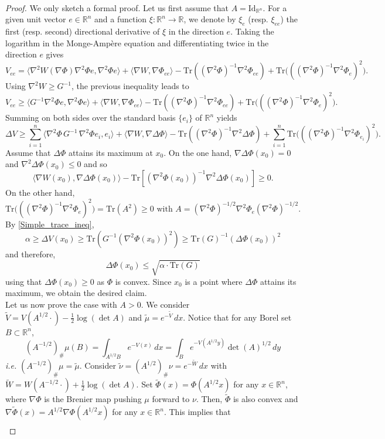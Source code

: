 \documentclass[11pt,a4paper,reqno]{amsart}
\numberwithin{equation}{section}
\theoremstyle{definition}
\renewcommand{\tilde}{\widetilde}
\newcommand{\<}{\ensuremath \leq}
\renewcommand{\>}{\ensuremath \geq}
\renewcommand{\tilde}{\widetilde}
\begin{document}
\hfill \\ \begin{proof} We only sketch a formal proof.
Let us first assume that $A=\mathrm{Id}_{\mathbb{R}^n}.$ 
For a given unit vector $e \in \mathbb{R}^n$ and a function $\xi: \mathbb{R}^n \rightarrow \mathbb{R}$, we denote by $\xi_e$ (resp. $\xi_{ee}$) the first (resp. second) directional derivative of $\xi$ in the direction $e.$ Taking the logarithm in the Monge-Ampère equation and differentiating twice in the direction $e$ gives $$V_{ee}=\langle \nabla^2 W(\nabla \Phi)\nabla^2 \Phi e, \nabla^2 \Phi e \rangle+\langle \nabla W, \nabla \Phi_{ee}\rangle-\mathrm{Tr}((\nabla^2 \Phi)^{-1}\nabla^2 \Phi_{ee})+\mathrm{Tr}\bigl(( (\nabla^2 \Phi)^{-1}\nabla^2 \Phi_e)^2\bigl).$$ Using $\nabla^2 W \geq G^{-1}$, the previous inequality leads to $$V_{ee} \geq \langle G^{-1}\nabla^2 \Phi e, \nabla^2 \Phi e\rangle+\langle \nabla W, \nabla \Phi_{ee}\rangle-\mathrm{Tr}((\nabla^2 \Phi)^{-1}\nabla^2 \Phi_{ee})+\mathrm{Tr}\bigl(( (\nabla^2 \Phi)^{-1}\nabla^2 \Phi_e)^2\bigl).$$ Summing on both sides over the standard basis $\{e_i\}$ of $\mathbb{R}^n$ yields $$\Delta V \geq \sum_{i=1}^n \langle \nabla^2 \Phi \, G^{-1}\, \nabla^2 \Phi e_i,e_i\rangle+\langle \nabla W, \nabla \Delta \Phi \rangle-\mathrm{Tr}((\nabla^2 \Phi)^{-1}\nabla^2 \Delta \Phi)+\sum_{i=1}^n \mathrm{Tr}\bigl(( (\nabla^2 \Phi)^{-1}\nabla^2 \Phi_{e_i})^2\bigl).$$ Assume that $\Delta \Phi$ attains its maximum at $x_0.$ On the one hand, $\nabla \Delta \Phi(x_0)=0$ and $\nabla^2 \Delta \Phi(x_0) \leq 0$ and so $$\langle \nabla W(x_0),\nabla \Delta \Phi(x_0)\rangle-\mathrm{Tr}[(\nabla^2 \Phi(x_0))^{-1}\nabla^2 \Delta \Phi(x_0)] \geq 0.$$ On the other hand, $$\mathrm{Tr}\bigl(( (\nabla^2 \Phi)^{-1}\nabla^2 \Phi_e)^2\bigl)=\mathrm{Tr}(A^2) \geq 0 \text{ with } A=(\nabla^2 \Phi)^{-1/2}\nabla^2 \Phi_e (\nabla^2 \Phi)^{-1/2}.$$ By \cref{Simple_trace_ineq}, $$\alpha \geq \Delta V(x_0) \geq \mathrm{Tr}(G^{-1}(\nabla^2 \Phi(x_0))^2) \geq \mathrm{Tr}(G)^{-1}(\Delta \Phi(x_0))^2$$ and therefore, $$\Delta \Phi(x_0) \leq \sqrt{\alpha \cdot \mathrm{Tr}(G)}$$ using that $\Delta \Phi(x_0) \geq 0$ as $\Phi$ is convex. Since $x_0$ is a point where $\Delta \Phi$ attains its maximum, we obtain the desired claim.  \\
Let us now prove the case with $A>0$. We consider $\tilde V=V(A^{1/2}\cdot)-\frac{1}{2}\log(\det A)$ and $\tilde \mu=e^{-\tilde V}\, dx.$ Notice that for any Borel set $B \subset \mathbb{R}^n$, $$(A^{-1/2})_{\#}\mu(B)=\int_{A^{1/2}B}e^{-V(x)}\, dx=\int_B e^{-V(A^{1/2}y)}\det(A)^{1/2}\, dy$$ \textit{i.e.} $(A^{-1/2})_{\#}\mu=\tilde \mu.$ Consider $\tilde \nu=(A^{1/2})_{\#}\nu=e^{-\tilde W}\, dx$ with $\tilde W=W(A^{-1/2}\cdot)+\frac{1}{2}\log(\det A).$ Set $\tilde \Phi(x)=\Phi(A^{1/2}x)$ for any $x \in \mathbb{R}^n$, where $\nabla \Phi$ is the Brenier map pushing $\mu$ forward to $\nu.$ Then, $\tilde \Phi$ is also convex and $\nabla \tilde \Phi(x)=A^{1/2} \nabla \Phi(A^{1/2}x)$ for any $x \in \mathbb{R}^n.$ This implies that $$\begin{array}{lll}

\end{array}$$
\end{proof}
\end{document}
